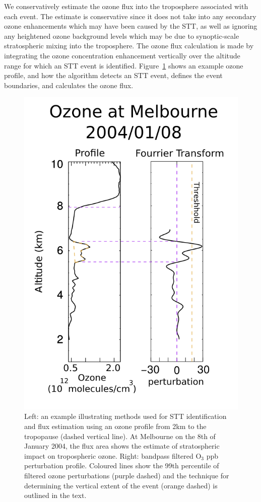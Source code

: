 \documentclass{article}
\begin{document}
    We conservatively estimate the ozone flux into the troposphere associated with each event.
    The estimate is conservative since it does not take into any secondary ozone enhancements which may have been caused by the STT, as well as ignoring any heightened ozone background levels which may be due to synoptic-scale stratospheric mixing into the troposphere.
    The ozone flux calculation is made by integrating the ozone concentration enhancement vertically over the altitude range for which an STT event is identified.
    Figure~\ref{fig:filterEG} shows an example ozone profile, and how the algorithm detects an STT event, defines the event boundaries, and calculates the ozone flux.
    
    \begin{figure}[!htbp]
      \begin{center}
      \includegraphics[width=0.8\columnwidth]{figures/filtereg.png}
      \caption{ Left: an example illustrating methods used for STT identification and flux estimation using an ozone profile from 2km to the tropopause (dashed vertical line).
      At Melbourne on the 8th of January 2004, the flux area shows the estimate of stratospheric impact on tropospheric ozone.
      Right: bandpass filtered O$_3$ ppb perturbation profile.
      Coloured lines show the 99th percentile of filtered ozone perturbations (purple dashed) and the technique for determining the vertical extent of the event (orange dashed) is outlined in the text.
      }
      \label{fig:filterEG}
      \end{center}
    \end{figure}
\end{document}
